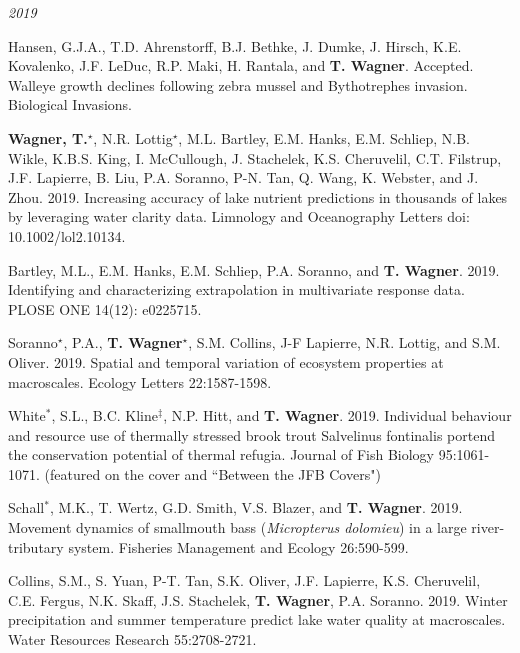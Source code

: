 \documentclass[10pt]{article}
\begin{document}
\begin{flushleft}
\begin{etaremune}[start=103]
\end{etaremune}

\vspace{5pt}
\emph{2019}
\begin{etaremune}[start=91]


\item Hansen, G.J.A., T.D. Ahrenstorff, B.J. Bethke, J. Dumke, J. Hirsch, K.E. Kovalenko, J.F. LeDuc, R.P. Maki, H. Rantala, and \textbf{T. Wagner}. Accepted. Walleye growth declines following zebra mussel and Bythotrephes invasion. Biological Invasions.

\item \textbf{Wagner, T.$^\star$}, N.R. Lottig$^\star$, M.L. Bartley, E.M. Hanks, E.M. Schliep, N.B. Wikle, K.B.S. King, I. McCullough, J. Stachelek, K.S. Cheruvelil, C.T. Filstrup, J.F. Lapierre, B. Liu, P.A. Soranno, P-N. Tan, Q. Wang, K. Webster, and J. Zhou. 2019. Increasing accuracy of lake nutrient predictions in thousands of lakes by leveraging water clarity data. Limnology and Oceanography Letters doi: 10.1002/lol2.10134. 

\item Bartley, M.L., E.M. Hanks, E.M. Schliep, P.A. Soranno, and \textbf{T. Wagner}. 2019. Identifying and characterizing extrapolation in multivariate response data. PLOSE ONE 14(12): e0225715.

\item Soranno$^\star$, P.A., \textbf{T. Wagner$^\star$}, S.M. Collins, J-F Lapierre, N.R. Lottig, and S.M. Oliver. 2019. Spatial and temporal variation of ecosystem properties at macroscales. Ecology Letters 22:1587-1598.

\item White$^*$, S.L., B.C. Kline$^\ddagger$, N.P. Hitt, and\textbf{ T. Wagner}. 2019. Individual behaviour and resource use of thermally stressed brook trout Salvelinus fontinalis portend the conservation potential of thermal refugia. Journal of Fish Biology 95:1061-1071. (featured on the cover and ``Between the JFB Covers")

\item Schall$^*$, M.K., T. Wertz, G.D. Smith, V.S. Blazer, and \textbf{T. Wagner}. 2019. Movement dynamics of smallmouth bass (\textit{Micropterus dolomieu}) in a large river-tributary system. Fisheries Management and Ecology 26:590-599.	

\item Collins, S.M., S. Yuan, P-T. Tan, S.K. Oliver, J.F. Lapierre, K.S. Cheruvelil, C.E. Fergus, N.K. Skaff, J.S. Stachelek, \textbf{T. Wagner}, P.A. Soranno. 2019. Winter precipitation and summer temperature predict lake water quality at macroscales. Water Resources Research 55:2708-2721.
	

\end{etaremune}
\end{flushleft}
\end{document}
